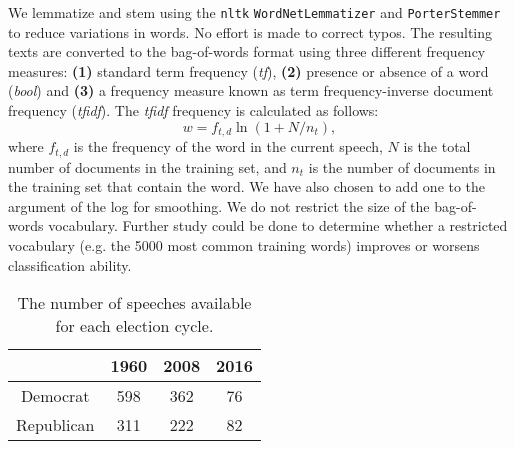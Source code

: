 \documentclass[aps, prl, reprint, showpacs]{revtex4-1}
\begin{document}
We lemmatize and stem using the \texttt{nltk} \texttt{WordNetLemmatizer} and \texttt{PorterStemmer} to reduce variations in words. No effort is made to correct typos. The resulting texts are converted to the bag-of-words format using three different frequency measures: \textbf{(1)} standard term frequency (\textit{tf}), \textbf{(2)} presence or absence of a word (\textit{bool}) and \textbf{(3)} a frequency measure known as term frequency-inverse document frequency (\textit{tfidf}). The \textit{tfidf} frequency is calculated as follows:
\begin{equation}
    w = f_{t,d} \ln (1 + N/n_t),
\end{equation}
where $f_{t,d}$ is the frequency of the word in the current speech, $N$ is the total number of documents in the training set, and $n_t$ is the number of documents in the training set that contain the word. We have also chosen to add one to the argument of the log for smoothing. We do not restrict the size of the bag-of-words vocabulary. Further study could be done to determine whether a restricted vocabulary (e.g. the 5000 most common training words) improves or worsens classification ability.

\begin{table}[h] %
  \label{tab:data}
  \begin{ruledtabular}
  \begin{tabular}{cccc}
   & 1960 & 2008 & 2016 \\
 \hline
    Democrat & 598 & 362  & 76  \\
    Republican & 311 & 222  & 82  \\

 \hline
  \end{tabular}
  \end{ruledtabular}
    \caption{The number of speeches available for each election cycle.}
\end{table}

\end{document}
